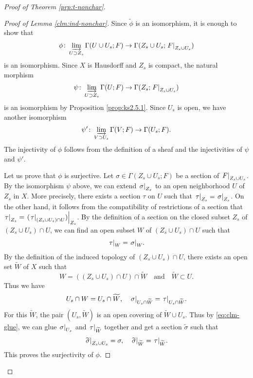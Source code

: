 \begin{proof}[{Proof of Theorem \ref{prp:t-nonchar}}]
\begin{proof}[Proof of Lemma \ref{clm:ind-nonchar}]
    Since \(\tilde{\phi}\) is an isomorphism, 
    it is enough to show that
    \begin{equation}\label{eq:isom-union}
      \phi\colon\indlim[U\supset Z_{s}]
      \Gamma(U\cup U_{s};F)
      \to
      \Gamma(Z_{s}\cup U_{s};\mres[F]{Z_{s}\cup U_{s}})    
    \end{equation}
    is an isomorphism.     
    Since \(X\) is Hausdorff and \(Z_{s}\) is compact, 
    the natural morphism 
    \[
      \psi\colon\indlim[U\supset Z_{s}]\Gamma(U;F)
      \to
      \Gamma(Z_{s};\mres[F]{Z_{s}\cup U_{s}})
    \]
    is an isomorphism by Proposition \ref{prop:ks2.5.1}. 
    Since \(U_{s}\) is open, we have another isomorphism 
    \[
      \psi'\colon\indlim[V\supset U_{s}]\Gamma(V;F)
      \to
      \Gamma(U_{s};F).
    \] 
    The injectivity of \(\phi\) follows from 
    the definition of a sheaf 
    and the injectivities of \(\psi\) and \(\psi'\). 

    Let us prove that \(\phi\) is surjective. 
    Let \(
      \sigma\in \Gamma(Z_{s}\cup U_{s};F)
    \) be a section of \(\mres[F]{Z_{s}\cup U_{s}}\). 
    By the isomorphism \(\psi\) above, 
    we can extend \(\mres[\sigma]{Z_{s}}\) to 
    an open neighborhood \(U\) of \(Z_{s}\) in \(X\). 
    More precisely, there exists a section 
    \(\tau\) on \(U\) such that \(
      \mres[\tau]{Z_{s}}=\mres[\sigma]{Z_{s}}
    \). 
    On the other hand, 
    it follows from the compatibility of restrictions of a section
    that \(
      \mres[\tau]{Z_{s}}
      =
      \mres[{(\mres[\tau]{(Z_{s}\cup U_{s})\cap U})}]{Z_{s}}
    \). 
    \textcolor{black}
    {B}y the definition of a section 
    on the closed subset \(Z_{s}\) of 
    \((Z_{s}\cup U_{s})\cap U\), 
    we can find an open subset \(W\) of 
    \((Z_{s}\cup U_{s})\cap U\) 
    such that 
    \begin{equation*}
      \mres[\tau]{W}=\mres[\sigma]{W}. 
    \end{equation*}
    By the definition of the induced topology 
    of \((Z_{s}\cup U_{s})\cap U\), 
    there exists an open set \(\widetilde{W}\) of \(X\) 
    such that
    \[
      W=((Z_{s}\cup U_{s})\cap U)\cap \widetilde{W}
      \quad\text{and}\quad
      \widetilde{W}\subset U.
    \] 
    Thus we have 
    \begin{equation}\label{eq:clm-glue}
      U_{s}\cap W = U_{s}\cap \widetilde{W},
      \quad
      \mres[\sigma]{U_{s}\cap \widetilde{W}}
      =\mres[\tau]{U_{s}\cap \widetilde{W}}.
    \end{equation}
    For this \(\widetilde{W}\), 
    the pair \(
      \left(U_{s}, \widetilde{W}\right)
    \) is an open covering of \(\widetilde{W}\cup U_{s}\). 
    Thus by \eqref{eq:clm-glue}, we can 
    glue \(\mres[\sigma]{U_{s}}\) 
    and \(\mres[\tau]{\widetilde{W}}\) together 
    and get a section \(\widetilde{\sigma}\) such that \[
      \mres[\widetilde{\sigma}]{Z_{s}\cup U_{s}} 
      =\sigma, 
      \quad
      \mres[\widetilde{\sigma}]{\widetilde{W}}
      =\mres[\tau]{\widetilde{W}}.
    \]
    This proves the surjectivity of \(\phi\). 
    

\end{proof}
\end{proof}

